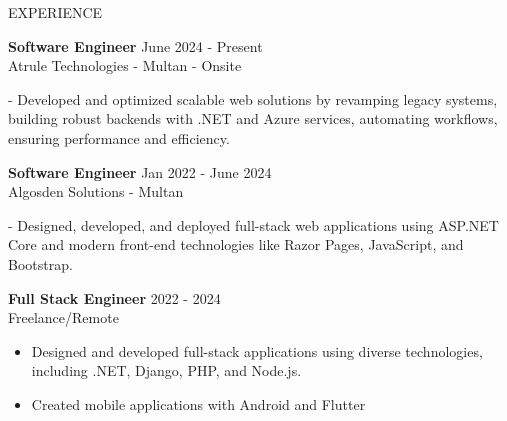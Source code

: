 \documentclass{resume} %
\begin{document}


\begin{rSection}{EXPERIENCE}
	
	\textbf{Software Engineer} \hfill June 2024 - Present\\
	Atrule Technologies - Multan - Onsite %
		\itemsep 1pt {} 
				
		\item - Developed and optimized scalable web solutions by revamping legacy systems, building robust backends with .NET and Azure services, automating workflows, ensuring performance and efficiency.
		
		
	
	
	\textbf{Software Engineer} \hfill Jan 2022 - June 2024\\
	Algosden Solutions - Multan %
		\itemsep 1pt {} 
		\item - Designed, developed, and deployed full-stack web applications using ASP.NET Core and modern front-end technologies like Razor Pages, JavaScript, and Bootstrap. 
		
				 
	
	\textbf{Full Stack Engineer} \hfill 2022 - 2024\\
	Freelance/Remote %
	\begin{itemize}
		\itemsep -3pt {} 
		\item Designed and developed full-stack applications using diverse technologies, including .NET, Django, PHP, and Node.js.
		\item Created mobile applications with Android and Flutter
	\end{itemize}
	

\end{rSection}
\end{document}
